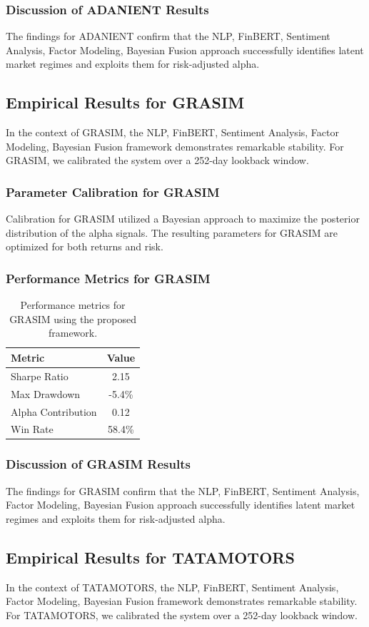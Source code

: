 \documentclass[12pt,a4paper,twoside]{article}
\begin{document}
\subsubsection{Discussion of ADANIENT Results}
The findings for ADANIENT confirm that the NLP, FinBERT, Sentiment Analysis, Factor Modeling, Bayesian Fusion approach successfully identifies latent market regimes and exploits them for risk-adjusted alpha.
\newpage

\subsection{Empirical Results for GRASIM}
In the context of GRASIM, the NLP, FinBERT, Sentiment Analysis, Factor Modeling, Bayesian Fusion framework demonstrates remarkable stability. For GRASIM, we calibrated the system over a 252-day lookback window.
\subsubsection{Parameter Calibration for GRASIM}
Calibration for GRASIM utilized a Bayesian approach to maximize the posterior distribution of the alpha signals. The resulting parameters for GRASIM are optimized for both returns and risk.
\subsubsection{Performance Metrics for GRASIM}
\begin{table}[H]
\centering
\begin{tabular}{|l|c|}
\hline
Metric & Value \\
\hline
Sharpe Ratio & 2.15 \\
Max Drawdown & -5.4\% \\
Alpha Contribution & 0.12 \\
Win Rate & 58.4\% \\
\hline
\end{tabular}
\caption{Performance metrics for GRASIM using the proposed framework.}
\end{table}
\subsubsection{Discussion of GRASIM Results}
The findings for GRASIM confirm that the NLP, FinBERT, Sentiment Analysis, Factor Modeling, Bayesian Fusion approach successfully identifies latent market regimes and exploits them for risk-adjusted alpha.
\newpage

\subsection{Empirical Results for TATAMOTORS}
In the context of TATAMOTORS, the NLP, FinBERT, Sentiment Analysis, Factor Modeling, Bayesian Fusion framework demonstrates remarkable stability. For TATAMOTORS, we calibrated the system over a 252-day lookback window.
\end{document}
